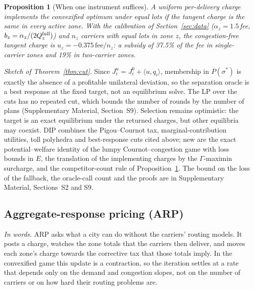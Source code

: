 \documentclass[preprint,11pt]{elsarticle}
\newtheorem{proposition}[theorem]{Proposition}
\theoremstyle{definition}
\theoremstyle{remark}
\newcommand{\ip}[2]{\langle #1,#2\rangle}
\newcommand{\SM}[1]{Supplementary Material, Section~#1}
\newcommand{\SMs}[1]{Supplementary Material, Sections~#1}
\begin{document}
\begin{proposition}[When one instrument suffices]\label{prop:uniform}
A uniform per-delivery charge implements the convexified optimum under equal lots if the tangent charge is the same in every active zone. With the calibration of Section~\ref{sec:data} ($\alpha_z=1.5\,$fee, $b_z=\alpha_z/(2Q^{\rm full}_z)$) and $n_z$ carriers with equal lots in zone $z$, the congestion-free tangent charge is $u_z=-0.375\,\mathrm{fee}/n_z$: a subsidy of 37.5\% of the fee in single-carrier zones and 19\% in two-carrier zones.
\end{proposition}

\emph{Sketch of Theorem~\ref{thm:cut}.} Since $J^u_i=J^0_i+\ip{u}{q_i}$, membership in $P(\sigma^*)$ is exactly the absence of a profitable unilateral deviation, so the separation oracle is a best response at the fixed target, not an equilibrium solve. The LP over the cuts has no repeated cut, which bounds the number of rounds by the number of plans (\SM{S9}). Selection remains optimistic: the target is an exact equilibrium under the returned charges, but other equilibria may coexist. DIP combines the Pigou--Cournot tax, marginal-contribution utilities, toll polyhedra and best-response cuts cited above; new are the exact potential--welfare identity of the lumpy Cournot--congestion game with loss bounds in $E$, the translation of the implementing charges by the $\Gamma$-maximin surcharge, and the competitor-count rule of Proposition~\ref{prop:uniform}. The bound on the loss of the fallback, the oracle-call count and the proofs are in \SMs{S2 and S9}.

\subsection{Aggregate-response pricing (ARP)}\label{sec:arp}

\emph{In words.} ARP asks what a city can do without the carriers' routing models. It posts a charge, watches the zone totals that the carriers then deliver, and moves each zone's charge towards the corrective tax that those totals imply. In the convexified game this update is a contraction, so the iteration settles at a rate that depends only on the demand and congestion slopes, not on the number of carriers or on how hard their routing problems are.
\end{document}
